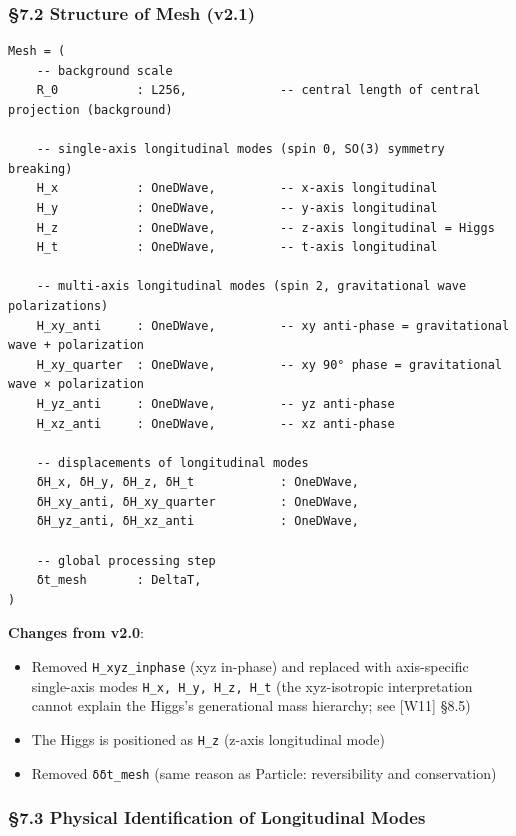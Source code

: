 \documentclass[a4paper,11pt]{article}
\providecommand{\tightlist}{\setlength{\itemsep}{0pt}\setlength{\parskip}{0pt}}
\begin{document}
\subsubsection{§7.2 Structure of Mesh
(v2.1)}\label{structure-of-mesh-v2.1}

\begin{verbatim}
Mesh = (
    -- background scale
    R_0           : L256,             -- central length of central projection (background)
    
    -- single-axis longitudinal modes (spin 0, SO(3) symmetry breaking)
    H_x           : OneDWave,         -- x-axis longitudinal
    H_y           : OneDWave,         -- y-axis longitudinal
    H_z           : OneDWave,         -- z-axis longitudinal = Higgs
    H_t           : OneDWave,         -- t-axis longitudinal
    
    -- multi-axis longitudinal modes (spin 2, gravitational wave polarizations)
    H_xy_anti     : OneDWave,         -- xy anti-phase = gravitational wave + polarization
    H_xy_quarter  : OneDWave,         -- xy 90° phase = gravitational wave × polarization
    H_yz_anti     : OneDWave,         -- yz anti-phase
    H_xz_anti     : OneDWave,         -- xz anti-phase
    
    -- displacements of longitudinal modes
    δH_x, δH_y, δH_z, δH_t            : OneDWave,
    δH_xy_anti, δH_xy_quarter         : OneDWave,
    δH_yz_anti, δH_xz_anti            : OneDWave,
    
    -- global processing step
    δt_mesh       : DeltaT,
)
\end{verbatim}

\textbf{Changes from v2.0}:

\begin{itemize}
\tightlist
\item
  Removed \texttt{H\_xyz\_inphase} (xyz in-phase) and replaced with
  axis-specific single-axis modes \texttt{H\_x,\ H\_y,\ H\_z,\ H\_t}
  (the xyz-isotropic interpretation cannot explain the Higgs's
  generational mass hierarchy; see {[}W11{]} §8.5)
\item
  The Higgs is positioned as \texttt{H\_z} (z-axis longitudinal mode)
\item
  Removed \texttt{δδt\_mesh} (same reason as Particle: reversibility and
  conservation)
\end{itemize}

\subsubsection{§7.3 Physical Identification of Longitudinal
Modes}\label{physical-identification-of-longitudinal-modes}
\end{document}
